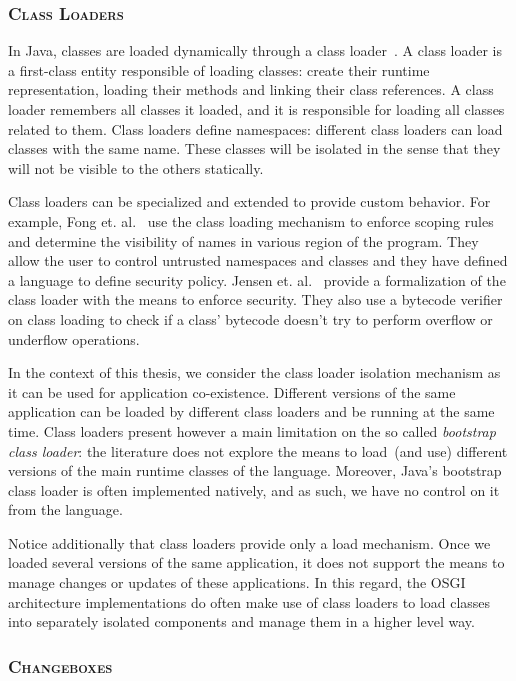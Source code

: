 \subsubsection*{\textsc{Class Loaders}}
In Java, classes are loaded dynamically through a class loader~\cite{Lian98a}. A class loader is a first-class entity responsible of loading classes: create their runtime representation, loading their methods and linking their class references. A class loader remembers all classes it loaded, and it is responsible for loading all classes related to  them. Class loaders define namespaces: different class loaders can load classes with the same name. These classes will be isolated in the sense that they will not be visible to the others statically.

Class loaders can be specialized and extended to provide custom behavior. For example, Fong et. al.~\cite{Fong10a} use the class loading mechanism to enforce scoping rules and determine the visibility of names in various region of the program. They allow the user to control untrusted
namespaces and classes and they have defined a language to define security policy. Jensen et. al.~\cite{Jens98a} provide a formalization of the class loader with the means to enforce security. They also use a bytecode verifier on class loading to check if a class' bytecode doesn't try to perform overflow or underflow operations.

In the context of this thesis, we consider the class loader isolation mechanism as it can be used for application co-existence. Different versions of the same application can be loaded by different class loaders and be running at the same time. Class loaders present however a main limitation on the so called \emph{bootstrap class loader}: the literature does not explore the means to load~(and use) different versions of the main runtime classes of the language. Moreover, Java's bootstrap class loader is often implemented natively, and as such, we have no control on it from the language.

Notice additionally that class loaders provide only a load mechanism. Once we loaded several versions of the same application, it does not support the means to manage changes or updates of these applications. In this regard, the OSGI~\cite{OSGI} architecture implementations do often make use of class loaders to load classes into separately isolated components and manage them in a higher level way.

\subsubsection*{\textsc{Changeboxes}}

